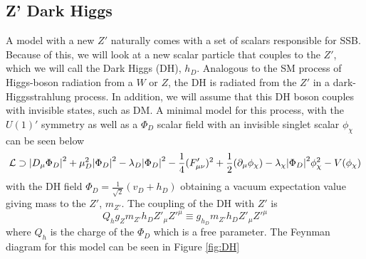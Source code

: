 \documentclass[12pt, a4paper]{book}
\begin{document}
\subsection{Z' Dark Higgs}
A model with a new $Z'$ naturally comes with a set of scalars responsible for SSB. Because of this, we will look at a new scalar particle that couples to the $Z'$, which we will call the Dark Higgs (DH), $h_D$. Analogous to the SM process of Higgs-boson radiation from a $W$ or $Z$, the DH is radiated from the $Z'$ in a dark-Higgsstrahlung process. 
In addition, we will assume that this DH boson couples with invisible states, such as DM. A minimal model for this process, with the $U(1)'$ symmetry as well as a $\Phi_D$ scalar field with an invisible singlet scalar $\phi_\chi$ can be seen below
\begin{equation}
    \mathcal{L}\supset \abs{D_\mu\Phi_D}^2 + \mu_D^2\abs{\Phi_D}^2 -\lambda_D\abs{\Phi_D}^2-\frac{1}{4}(F'_{\mu\nu})^2 + \frac{1}{2}(\partial_\mu\phi_\chi)-\lambda_\chi\abs{\Phi_D}^2\phi_\chi^2 - V(\phi_\chi)
\end{equation}
with the DH field $\Phi_D =\frac{1}{\sqrt{2}}(v_D+h_D)$ obtaining a vacuum expectation value giving mass to the $Z'$, $m_{Z'}$. The coupling of the DH with $Z'$ is
\begin{equation}
    Q_hg_Zm_{Z'}h_DZ'_\mu Z'^\mu \equiv g_{h_D}m_{Z'}h_DZ'_\mu Z'^\mu
\end{equation}
where $Q_h$ is the charge of the $\Phi_D$ which is a free parameter. The Feynman diagram for this model can be seen in Figure \ref{fig:DH}
\end{document}
